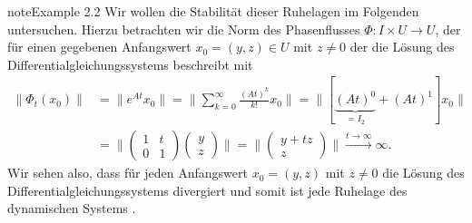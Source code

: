 \documentclass[letterpaper,10pt,german]{jupyterBook}
\begin{document}
\begin{sphinxadmonition}{note}{Example 2.2}
\sphinxAtStartPar
Wir wollen die Stabilität dieser Ruhelagen im Folgenden untersuchen.
Hierzu betrachten wir die Norm des Phasenflusses \(\Phi \colon I \times U \rightarrow U\), der für einen gegebenen Anfangswert \(x_0 = (y,z) \in U\) mit \(z \neq 0\) der die Lösung des Differentialgleichungssystems beschreibt mit
\begin{equation*}
\begin{split}\| \Phi_t(x_0) \| &= \| e^{At}x_0 \| = \| \sum_{k=0}^\infty \frac{(At)^k}{k!} x_0\| = \| [\underbrace{(At)^0}_{=I_2} + (At)^1] x_0\| \\
&= \| \begin{pmatrix} 1 & t \\ 0 & 1\end{pmatrix}\begin{pmatrix} y \\ z \end{pmatrix} \| = \| \begin{pmatrix} y + tz \\ z\end{pmatrix} \| \overset{t\to \infty}{\longrightarrow} \infty.\end{split}
\end{equation*}
\sphinxAtStartPar
Wir sehen also, dass für jeden Anfangswert \(x_0 = (y,z)\) mit \(z \neq 0\) die Lösung des Differentialgleichungssystems divergiert und somit ist jede Ruhelage des dynamischen Systems .
\end{sphinxadmonition}
\end{document}
